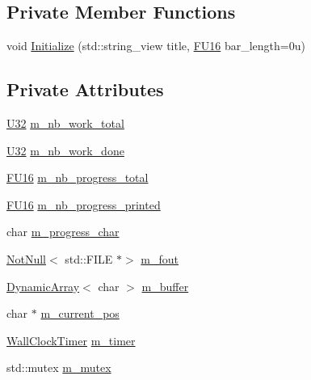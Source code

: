 \subsection*{Private Member Functions}
\begin{DoxyCompactItemize}
\item 
void \mbox{\hyperlink{classmage_1_1_progress_reporter_1_1_impl_a74fc88eb682a8f5affc22130d010af80}{Initialize}} (std\+::string\+\_\+view title, \mbox{\hyperlink{namespacemage_a4888c2a93673ffcfc3195e561dfdd893}{F\+U16}} bar\+\_\+length=0u)
\end{DoxyCompactItemize}
\subsection*{Private Attributes}
\begin{DoxyCompactItemize}
\item 
\mbox{\hyperlink{namespacemage_aa5d6eaabaac3cdd01873d6a3d27e90f3}{U32}} \mbox{\hyperlink{classmage_1_1_progress_reporter_1_1_impl_a58c67973a05cb65276612f56ff4409a6}{m\+\_\+nb\+\_\+work\+\_\+total}}
\item 
\mbox{\hyperlink{namespacemage_aa5d6eaabaac3cdd01873d6a3d27e90f3}{U32}} \mbox{\hyperlink{classmage_1_1_progress_reporter_1_1_impl_ad35ff8031b2826f41912abc44dbd1d24}{m\+\_\+nb\+\_\+work\+\_\+done}}
\item 
\mbox{\hyperlink{namespacemage_a4888c2a93673ffcfc3195e561dfdd893}{F\+U16}} \mbox{\hyperlink{classmage_1_1_progress_reporter_1_1_impl_a9ae041025e9e7401e2799d6890459343}{m\+\_\+nb\+\_\+progress\+\_\+total}}
\item 
\mbox{\hyperlink{namespacemage_a4888c2a93673ffcfc3195e561dfdd893}{F\+U16}} \mbox{\hyperlink{classmage_1_1_progress_reporter_1_1_impl_ac4e193520013c0cd5a68b3ef8de5fb8f}{m\+\_\+nb\+\_\+progress\+\_\+printed}}
\item 
char \mbox{\hyperlink{classmage_1_1_progress_reporter_1_1_impl_a6796267101fa30e107ed0d5031a8dca3}{m\+\_\+progress\+\_\+char}}
\item 
\mbox{\hyperlink{namespacemage_a8769f9d670d6b585ea306cb1062af94b}{Not\+Null}}$<$ std\+::\+F\+I\+LE $\ast$$>$ \mbox{\hyperlink{classmage_1_1_progress_reporter_1_1_impl_a80cffcd89826c3a172af53033a3dd8f0}{m\+\_\+fout}}
\item 
\mbox{\hyperlink{classmage_1_1_dynamic_array}{Dynamic\+Array}}$<$ char $>$ \mbox{\hyperlink{classmage_1_1_progress_reporter_1_1_impl_a5f347126852a59e05930906fcea49dc3}{m\+\_\+buffer}}
\item 
char $\ast$ \mbox{\hyperlink{classmage_1_1_progress_reporter_1_1_impl_ab1513044548160ad7a6d181ae2618f1b}{m\+\_\+current\+\_\+pos}}
\item 
\mbox{\hyperlink{namespacemage_a06f4035ef59f07892e594bf1178a108a}{Wall\+Clock\+Timer}} \mbox{\hyperlink{classmage_1_1_progress_reporter_1_1_impl_a8eea94dc2c87abc34d80ad61b5adea2e}{m\+\_\+timer}}
\item 
std\+::mutex \mbox{\hyperlink{classmage_1_1_progress_reporter_1_1_impl_acc8b21e5c74a202b1fb8f80a26132bfc}{m\+\_\+mutex}}
\end{DoxyCompactItemize}


